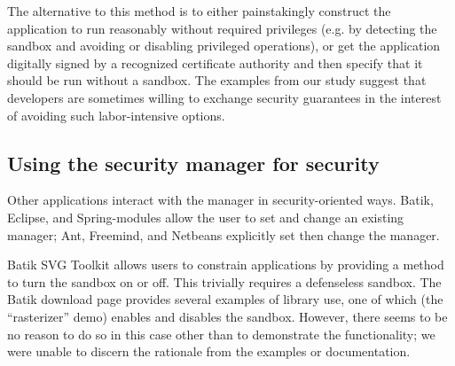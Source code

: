 \documentclass{sig-alternate}
\begin{document}
The alternative to this method is to either painstakingly
construct the application to run reasonably without required privileges (e.g. by
detecting the sandbox and avoiding or disabling privileged operations), or get
the application digitally signed by a recognized certificate authority and
then specify that it should be run without a sandbox.  The examples from our study suggest that
developers are sometimes willing to exchange security guarantees in the interest
of avoiding such labor-intensive options.

\subsection{Using the security manager for security}
\label{sub:Using-the-Security}

Other applications interact with the manager in
security-oriented ways. %
Batik,
Eclipse, and Spring-modules
allow the user to set and change an existing manager;
Ant, Freemind, and Netbeans explicitly set then change the manager.

Batik SVG Toolkit allows users to constrain applications
by providing a method to turn the sandbox on or off. 
This trivially
requires a defenseless sandbox. The Batik download page
provides several examples of library use, one of which (the
``rasterizer'' demo) enables and disables the sandbox.  However, there seems to
be no reason to do so in this case other than to demonstrate the functionality;
we were unable to discern the rationale from the examples or
documentation.

\end{document}
